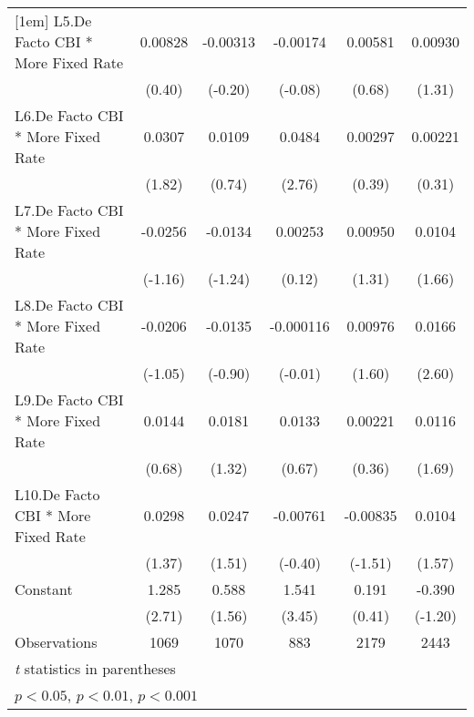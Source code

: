 {\begin{longtable}{l*{5}{c}}
[1em]
L5.De Facto CBI * More Fixed Rate&  0.00828         & -0.00313         & -0.00174         &  0.00581         &  0.00930         \\
                &   (0.40)         &  (-0.20)         &  (-0.08)         &   (0.68)         &   (1.31)         \\
[1em]
L6.De Facto CBI * More Fixed Rate&   0.0307         &   0.0109         &   0.0484\sym{**} &  0.00297         &  0.00221         \\
                &   (1.82)         &   (0.74)         &   (2.76)         &   (0.39)         &   (0.31)         \\
[1em]
L7.De Facto CBI * More Fixed Rate&  -0.0256         &  -0.0134         &  0.00253         &  0.00950         &   0.0104         \\
                &  (-1.16)         &  (-1.24)         &   (0.12)         &   (1.31)         &   (1.66)         \\
[1em]
L8.De Facto CBI * More Fixed Rate&  -0.0206         &  -0.0135         &-0.000116         &  0.00976         &   0.0166\sym{*}  \\
                &  (-1.05)         &  (-0.90)         &  (-0.01)         &   (1.60)         &   (2.60)         \\
[1em]
L9.De Facto CBI * More Fixed Rate&   0.0144         &   0.0181         &   0.0133         &  0.00221         &   0.0116         \\
                &   (0.68)         &   (1.32)         &   (0.67)         &   (0.36)         &   (1.69)         \\
[1em]
L10.De Facto CBI * More Fixed Rate&   0.0298         &   0.0247         & -0.00761         & -0.00835         &   0.0104         \\
                &   (1.37)         &   (1.51)         &  (-0.40)         &  (-1.51)         &   (1.57)         \\
[1em]
Constant        &    1.285\sym{**} &    0.588         &    1.541\sym{***}&    0.191         &   -0.390         \\
                &   (2.71)         &   (1.56)         &   (3.45)         &   (0.41)         &  (-1.20)         \\
\hline
Observations    &     1069         &     1070         &      883         &     2179         &     2443         \\
\hline\hline
\multicolumn{6}{l}{\footnotesize \textit{t} statistics in parentheses}\\
\multicolumn{6}{l}{\footnotesize \sym{*} \(p<0.05\), \sym{**} \(p<0.01\), \sym{***} \(p<0.001\)}\\
\end{longtable}
}
